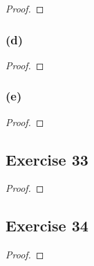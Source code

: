 \documentclass[14pt]{extarticle}
\begin{document}
\begin{proof}

\end{proof}

\subsubsection{(d)}

\begin{proof}

\end{proof}

\subsubsection{(e)}

\begin{proof}

\end{proof}

\subsection{Exercise 33}

\begin{proof}

\end{proof}

\subsection{Exercise 34}

\begin{proof}

\end{proof}
\end{document}
